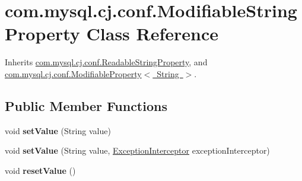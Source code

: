 \hypertarget{classcom_1_1mysql_1_1cj_1_1conf_1_1_modifiable_string_property}{}\section{com.\+mysql.\+cj.\+conf.\+Modifiable\+String\+Property Class Reference}
\label{classcom_1_1mysql_1_1cj_1_1conf_1_1_modifiable_string_property}


Inherits \mbox{\hyperlink{classcom_1_1mysql_1_1cj_1_1conf_1_1_readable_string_property}{com.\+mysql.\+cj.\+conf.\+Readable\+String\+Property}}, and \mbox{\hyperlink{interfacecom_1_1mysql_1_1cj_1_1conf_1_1_modifiable_property}{com.\+mysql.\+cj.\+conf.\+Modifiable\+Property$<$ String $>$}}.

\subsection*{Public Member Functions}
\begin{DoxyCompactItemize}
\item 
\mbox{\label{classcom_1_1mysql_1_1cj_1_1conf_1_1_modifiable_string_property_a773bdb8f021ea228fb50b8157b8d7df4}} 
void {\bfseries set\+Value} (String value)
\item 
\mbox{\label{classcom_1_1mysql_1_1cj_1_1conf_1_1_modifiable_string_property_a674e8599c141340fbc6e7e6acd7a2af2}} 
void {\bfseries set\+Value} (String value, \mbox{\hyperlink{interfacecom_1_1mysql_1_1cj_1_1exceptions_1_1_exception_interceptor}{Exception\+Interceptor}} exception\+Interceptor)
\item 
\mbox{\label{classcom_1_1mysql_1_1cj_1_1conf_1_1_modifiable_string_property_a20025de14d8ef02a6b6d8427d6833609}} 
void {\bfseries reset\+Value} ()
\end{DoxyCompactItemize}
